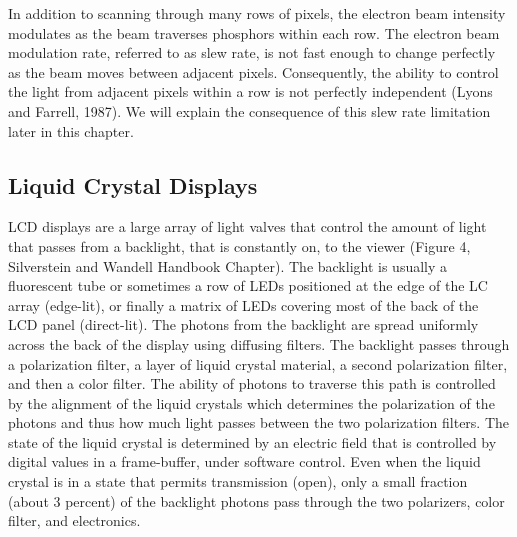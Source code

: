\documentclass[
  letterpaper,
]{book}
\begin{document}
In addition to scanning through many rows of pixels, the electron beam
intensity modulates as the beam traverses phosphors within each row. The
electron beam modulation rate, referred to as slew rate, is not fast
enough to change perfectly as the beam moves between adjacent pixels.
Consequently, the ability to control the light from adjacent pixels
within a row is not perfectly independent (Lyons and Farrell, 1987). We
will explain the consequence of this slew rate limitation later in this
chapter.

\subsection{Liquid Crystal Displays}\label{liquid-crystal-displays}

LCD displays are a large array of light valves that control the amount
of light that passes from a backlight, that is constantly on, to the
viewer (Figure 4, Silverstein and Wandell Handbook Chapter). The
backlight is usually a fluorescent tube or sometimes a row of LEDs
positioned at the edge of the LC array (edge-lit), or finally a matrix
of LEDs covering most of the back of the LCD panel (direct-lit). The
photons from the backlight are spread uniformly across the back of the
display using diffusing filters. The backlight passes through a
polarization filter, a layer of liquid crystal material, a second
polarization filter, and then a color filter. The ability of photons to
traverse this path is controlled by the alignment of the liquid crystals
which determines the polarization of the photons and thus how much light
passes between the two polarization filters. The state of the liquid
crystal is determined by an electric field that is controlled by digital
values in a frame-buffer, under software control. Even when the liquid
crystal is in a state that permits transmission (open), only a small
fraction (about 3 percent) of the backlight photons pass through the two
polarizers, color filter, and electronics.
\end{document}
